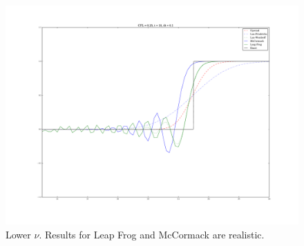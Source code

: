 \documentclass[a4paper]{article}
\begin{document}
\begin{figure}
    \centering
    \includegraphics[width=1.0\textwidth]{cfl_025.pdf}
    \caption{Lower $\nu$. Results for Leap Frog and McCormack are realistic.}\label{fig:cfl_025}
\end{figure}
\end{document}
